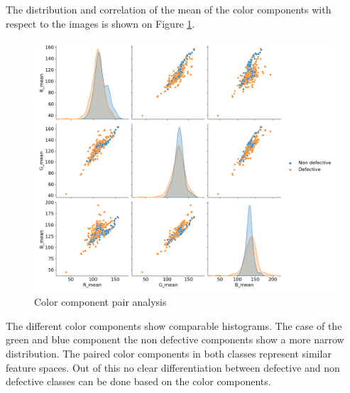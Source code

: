 \documentclass[10pt, final]{article}
\begin{document}
The distribution and correlation of the mean of the color components with respect to the images is shown on
Figure \ref{fig:comp_pair}.
\begin{figure}[!ht]
	\centering
	\includegraphics[width=\textwidth]{./tex_graphs/comp_pair.png}
	\caption{Color component pair analysis}
	\label{fig:comp_pair}
\end{figure}

The different color components show comparable histograms.
The case of the green and blue component the non defective components show a more narrow distribution.
The paired color components in both classes represent similar feature spaces.
Out of this no clear differentiation between defective and non defective classes can be done based on the color components.
\end{document}
